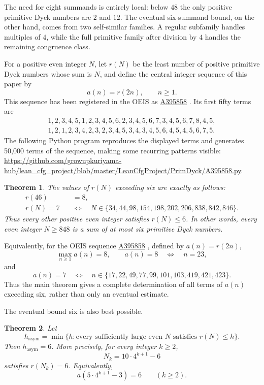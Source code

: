 \documentclass[12pt]{article}
\theoremstyle{plain}
\newtheorem{theorem}{Theorem}
\theoremstyle{definition}
\theoremstyle{plain}
\newcommand{\seqnum}[1]{\href{https://oeis.org/#1}{\rm \underline{#1}}}
\begin{document}
The need for eight summands is entirely local: below $48$ the only
positive primitive Dyck numbers are $2$ and $12$.  The eventual
six-summand bound, on the other hand, comes from two self-similar
families.  A regular subfamily handles multiples of $4$, while the full
primitive family after division by $4$ handles the remaining congruence
class.

For a positive even integer $N$, let $r(N)$ be the least number of
positive primitive Dyck numbers whose sum is $N$, and define the central
integer sequence of this paper by
\[
        a(n)=r(2n),\qquad n\geq1.
\]
This sequence has been registered in the OEIS as
\seqnum{A395858} \cite{OEIS-A395858}.  Its first fifty terms are
\[
\begin{gathered}
1,2,3,4,5,1,2,3,4,5,6,2,3,4,5,6,7,3,4,5,6,7,8,4,5,\\
1,2,1,2,3,4,2,3,2,3,4,5,3,4,3,4,5,6,4,5,4,5,6,7,5.
\end{gathered}
\]
The following Python program reproduces the displayed terms and generates
50,000 terms of the sequence, making some recurring patterns visible:
\url{https://github.com/growupkuriyama-hub/lean_cfg_project/blob/master/LeanCfgProject/PrimDyck/A395858.py}.

\begin{theorem}\label{thm:classification}
The values of $r(N)$ exceeding six are exactly as follows:
\[
\begin{aligned}
 r(46)&=8,\\[4pt]
 r(N)=7\quad&\Longleftrightarrow\quad
 N\in\{34,44,98,154,198,202,206,838,842,846\}.
\end{aligned}
\]
Thus every other positive even integer satisfies $r(N)\leq6$.  In other
words, every even integer $N\geq848$ is a sum of at most six primitive
Dyck numbers.
\end{theorem}

Equivalently, for the OEIS sequence \seqnum{A395858}
\cite{OEIS-A395858}, defined by $a(n)=r(2n)$,
\[
        \max_{n\geq1}a(n)=8,
        \qquad
        a(n)=8\quad\Longleftrightarrow\quad n=23,
\]
and
\[
 a(n)=7
 \quad\Longleftrightarrow\quad
 n\in\{17,22,49,77,99,101,103,419,421,423\}.
\]
Thus the main theorem gives a complete determination of all terms of
$a(n)$ exceeding six, rather than only an eventual estimate.


The eventual bound six is also best possible.

\begin{theorem}\label{thm:asymptotic-order}
Let
\[
 h_{\mathrm{asym}}
 =\min\{h:\text{every sufficiently large even }N\text{ satisfies }r(N)\leq h\}.
\]
Then $h_{\mathrm{asym}}=6$.  More precisely, for every integer $k\geq2$,
\[
 N_k=10\cdot4^{k+1}-6
\]
satisfies $r(N_k)=6$.  Equivalently,
\[
 a(5\cdot4^{k+1}-3)=6\qquad(k\geq2).
\]
\end{theorem}
\end{document}

